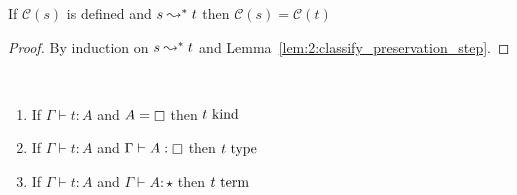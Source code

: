 \begin{lemma}
    \label{lem:2:classify_preservation}
    If $\mathcal{C}(s)$ is defined and $s \leadsto^* t$ then $\mathcal{C}(s) = \mathcal{C}(t)$
\end{lemma}
\begin{proof}
    By induction on $s \leadsto^* t$ and Lemma~\ref{lem:2:classify_preservation_step}.
\end{proof}

\begin{theorem}
    \label{lem:2:classify_soundness}
    \textcolor{white}{\_}
    \begin{enumerate}
        \item If $\Gamma \vdash t : A$ and $A = \kind$ then $t~\textnormal{kind}$
        \item If $\Gamma \vdash t : A$ and $\Gamma \vdash A : \kind$ then $t~\textnormal{type}$
        \item If $\Gamma \vdash t : A$ and $\Gamma \vdash A : \star$ then $t~\textnormal{term}$
    \end{enumerate}
\end{theorem}

